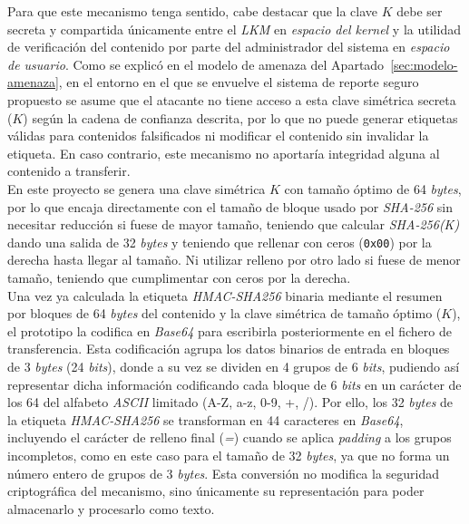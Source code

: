 Para que este mecanismo tenga sentido, cabe destacar que la clave \(K\) debe ser secreta y compartida únicamente entre el \textit{LKM} en \textit{espacio del kernel} y la utilidad de verificación del contenido por parte del administrador del sistema en \textit{espacio de usuario}.
Como se explicó en el modelo de amenaza del Apartado~\ref{sec:modelo-amenaza}, en el entorno en el que se envuelve el sistema de reporte seguro propuesto se asume que el atacante no tiene acceso a esta clave simétrica secreta (\(K\)) según la cadena de confianza descrita, por lo que no puede generar etiquetas válidas para contenidos falsificados ni modificar el contenido sin invalidar la etiqueta.
En caso contrario, este mecanismo no aportaría integridad alguna al contenido a transferir.\\

En este proyecto se genera una clave simétrica \(K\) con tamaño óptimo de 64 \textit{bytes}, por lo que encaja directamente con el tamaño de bloque usado por \textit{SHA-256} sin necesitar reducción si fuese de mayor tamaño, teniendo que calcular \textit{SHA-256(K)} dando una salida de 32 \textit{bytes} y teniendo que rellenar con ceros (\texttt{0x00}) por la derecha hasta llegar al tamaño.
Ni utilizar relleno por otro lado si fuese de menor tamaño, teniendo que cumplimentar con ceros por la derecha.\\

Una vez ya calculada la etiqueta \textit{HMAC-SHA256} binaria mediante el resumen por bloques de 64 \textit{bytes} del contenido y la clave simétrica de tamaño óptimo (\(K\)), el prototipo la codifica en \textit{Base64} para escribirla posteriormente en el fichero de transferencia.
Esta codificación agrupa los datos binarios de entrada en bloques de 3 \textit{bytes} (24 \textit{bits}), donde a su vez se dividen en 4 grupos de 6 \textit{bits}, pudiendo así representar dicha información codificando cada bloque de 6 \textit{bits} en un carácter de los 64 del alfabeto \textit{ASCII} limitado (A-Z, a-z, 0-9, +, /).
Por ello, los 32 \textit{bytes} de la etiqueta \textit{HMAC-SHA256} se transforman en 44 caracteres en \textit{Base64}, incluyendo el carácter de relleno final (\textit{=}) cuando se aplica \textit{padding} a los grupos incompletos, como en este caso para el tamaño de 32 \textit{bytes}, ya que no forma un número entero de grupos de 3 \textit{bytes}.
Esta conversión no modifica la seguridad criptográfica del mecanismo, sino únicamente su representación para poder almacenarlo y procesarlo como texto.\\

